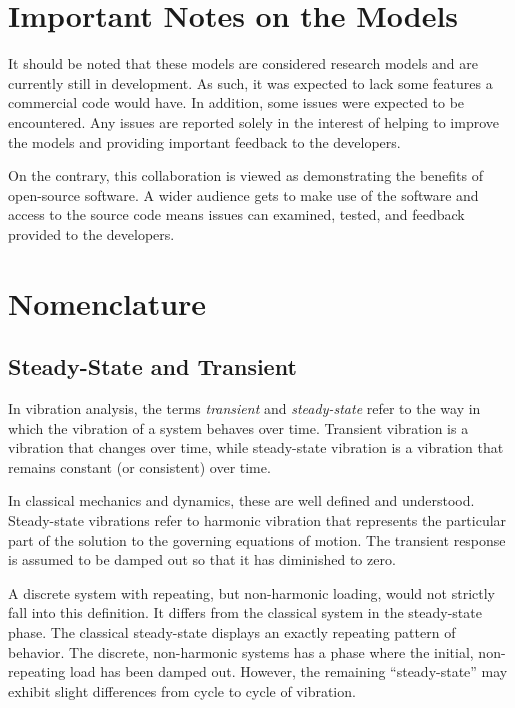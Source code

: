 \section{Important Notes on the Models}
It should be noted that these models are considered research models and are currently still in development.  As such, it was expected to lack some features a commercial code would have.  In addition, some issues were expected to be encountered.  Any issues are reported solely in the interest of helping to improve the models and providing important feedback to the developers.  

On the contrary, this collaboration is viewed as demonstrating the benefits of open-source software.  A wider audience gets to make use of the software and access to the source code means issues can examined, tested, and feedback provided to the developers.

\section{Nomenclature}
\subsection{Steady-State and Transient}
In vibration analysis, the terms \emph{transient} and \emph{steady-state} refer to the way in which the vibration of a system behaves over time.  Transient vibration is a vibration that changes over time, while steady-state vibration is a vibration that remains constant (or consistent) over time.

In classical mechanics and dynamics, these are well defined and understood.  Steady-state vibrations refer to harmonic vibration that represents the particular part of the solution to the governing equations of motion.  The transient response is assumed to be damped out so that it has diminished to zero.

A discrete system with repeating, but non-harmonic loading, would not strictly fall into this definition.  It differs from the classical system in the steady-state phase.  The classical steady-state displays an exactly repeating pattern of behavior.  The discrete, non-harmonic systems has a phase where the initial, non-repeating load has been damped out.  However, the remaining ``steady-state'' may exhibit slight differences from cycle to cycle of vibration.

